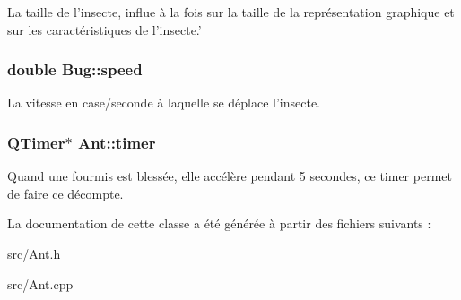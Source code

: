 La taille de l'insecte, influe à la fois sur la taille de la représentation graphique et sur les caractéristiques de l'insecte.' \hypertarget{classBug_a13b95fbf23748ea853b01bfd0b0e7fc8}{
\subsubsection[{speed}]{\setlength{\rightskip}{0pt plus 5cm}double {\bf Bug::speed}}}
\label{classBug_a13b95fbf23748ea853b01bfd0b0e7fc8}
La vitesse en case/seconde à laquelle se déplace l'insecte. \hypertarget{classAnt_a0535768a0f4cb7682a13c6cd514cf7b0}{
\subsubsection[{timer}]{\setlength{\rightskip}{0pt plus 5cm}QTimer$\ast$ {\bf Ant::timer}}}
\label{classAnt_a0535768a0f4cb7682a13c6cd514cf7b0}
Quand une fourmis est blessée, elle accélère pendant 5 secondes, ce timer permet de faire ce décompte. 

La documentation de cette classe a été générée à partir des fichiers suivants :\begin{DoxyCompactItemize}
\item 
src/Ant.h\item 
src/Ant.cpp\end{DoxyCompactItemize}

